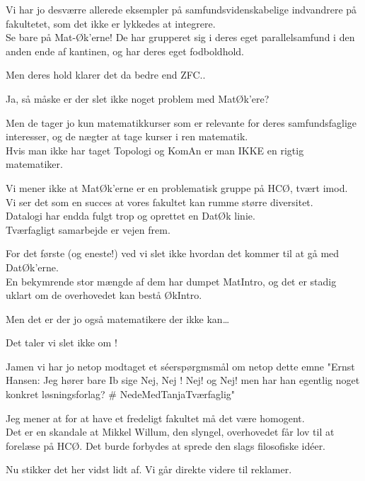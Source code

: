 \documentclass[a4paper,11pt]{article}
\begin{document}
\begin{sketch}
Vi har jo desværre allerede eksempler på samfundsvidenskabelige indvandrere på fakultetet, som det ikke er lykkedes at integrere.\\
Se bare på Mat-Øk’erne! De har grupperet sig i deres eget parallelsamfund i den anden ende af kantinen, og har deres eget fodboldhold.

 Men deres hold klarer det da bedre end ZFC..

 Ja, så måske er der slet ikke noget problem med MatØk'ere?

 Men de tager jo kun matematikkurser som er relevante for deres samfundsfaglige interesser, og de nægter at tage kurser i ren matematik.\\
Hvis man ikke har taget Topologi og KomAn er man IKKE en rigtig matematiker.

Vi mener ikke at MatØk’erne er en problematisk gruppe på HCØ, tvært imod.\\
Vi ser det som en succes at vores fakultet kan rumme større diversitet.\\
Datalogi har endda fulgt trop og oprettet en DatØk linie.\\
Tværfagligt samarbejde er vejen frem.

For det første (og eneste!) ved vi slet ikke hvordan det kommer til at gå med DatØk’erne.\\
En bekymrende stor mængde af dem har dumpet MatIntro, og det er stadig uklart om de overhovedet kan bestå ØkIntro.

Men det er der jo også matematikere der ikke kan…

Det taler vi slet ikke om !

 Jamen vi har jo netop modtaget et séerspørgmsmål om netop dette emne 
"Ernst Hansen: Jeg hører bare Ib sige Nej, Nej ! Nej! og Nej! men har han egentlig noget konkret løsningsforlag? \# NedeMedTanjaTværfaglig"

 Jeg mener at for at have et fredeligt fakultet må det være homogent.\\
Det er en skandale at Mikkel Willum, den slyngel, overhovedet får lov til at forelæse på HCØ. Det burde forbydes at sprede den slags filosofiske idéer.

 Nu stikker det her vidst lidt af. Vi går direkte videre til reklamer.


\end{sketch}
\end{document}
